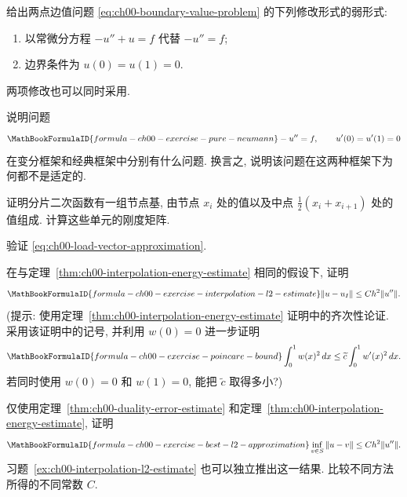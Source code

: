 \begin{MBExercise}
\label{ex:ch00-modified-weak-formulations}
给出两点边值问题 \eqref{eq:ch00-boundary-value-problem} 的下列修改形式的弱形式:
\begin{enumerate}[label=\alph*)]
\item 以常微分方程 $-u''+u=f$ 代替 $-u''=f$;
\item 边界条件为 $u(0)=u(1)=0$.
\end{enumerate}
两项修改也可以同时采用.
\end{MBExercise}

\begin{MBExercise}
\label{ex:ch00-neumann-not-well-posed}
说明问题
\[
\MathBookFormulaID{formula-ch00-exercise-pure-neumann}
-u''=f,
\qquad u'(0)=u'(1)=0
\]
在变分框架和经典框架中分别有什么问题. 换言之, 说明该问题在这两种框架下为何都不是适定的.
\end{MBExercise}

\begin{MBExercise}
\label{ex:ch00-piecewise-quadratic-basis}
证明分片二次函数有一组节点基, 由节点 $x_i$ 处的值以及中点 $\frac12(x_i+x_{i+1})$ 处的值组成. 计算这些单元的刚度矩阵.
\end{MBExercise}

\begin{MBExercise}
\label{ex:ch00-load-vector-verification}
验证 \eqref{eq:ch00-load-vector-approximation}.
\end{MBExercise}

\begin{MBExercise}
\label{ex:ch00-interpolation-l2-estimate}
在与定理~\ref{thm:ch00-interpolation-energy-estimate} 相同的假设下, 证明
\[
\MathBookFormulaID{formula-ch00-exercise-interpolation-l2-estimate}
\|u-u_I\|\leq Ch^2\|u''\|.
\]
(提示: 使用定理~\ref{thm:ch00-interpolation-energy-estimate} 证明中的齐次性论证. 采用该证明中的记号, 并利用 $w(0)=0$ 进一步证明
\[
\MathBookFormulaID{formula-ch00-exercise-poincare-bound}
\int_0^1w(x)^2\,dx\leq\widetilde c\int_0^1w'(x)^2\,dx.
\]
若同时使用 $w(0)=0$ 和 $w(1)=0$, 能把 $\widetilde c$ 取得多小?)
\end{MBExercise}

\begin{MBExercise}
\label{ex:ch00-best-l2-approximation}
仅使用定理~\ref{thm:ch00-duality-error-estimate} 和定理~\ref{thm:ch00-interpolation-energy-estimate}, 证明
\[
\MathBookFormulaID{formula-ch00-exercise-best-l2-approximation}
\inf_{v\in S}\|u-v\|\leq Ch^2\|u''\|.
\]
习题~\ref{ex:ch00-interpolation-l2-estimate} 也可以独立推出这一结果. 比较不同方法所得的不同常数 $C$.
\end{MBExercise}


